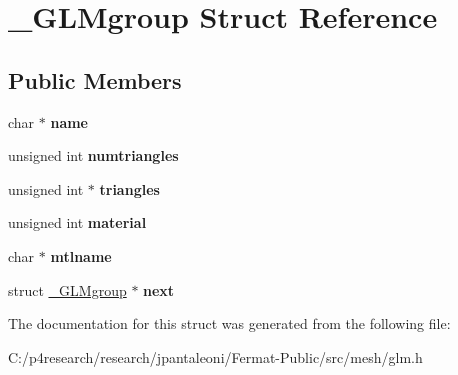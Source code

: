 \hypertarget{struct___g_l_mgroup}{}\section{\+\_\+\+G\+L\+Mgroup Struct Reference}
\label{struct___g_l_mgroup}
\subsection*{Public Members}
\begin{DoxyCompactItemize}
\item 
\mbox{\label{struct___g_l_mgroup_a17de10f71e980597335b72790acd6ec1}} 
char $\ast$ {\bfseries name}
\item 
\mbox{\label{struct___g_l_mgroup_aef01e77600bd78e9b86a00b35a78b93d}} 
unsigned int {\bfseries numtriangles}
\item 
\mbox{\label{struct___g_l_mgroup_ae6d76d287f9fd8b00206e90350cdf2d3}} 
unsigned int $\ast$ {\bfseries triangles}
\item 
\mbox{\label{struct___g_l_mgroup_af01897ad82f5b4416bbd2cab53f44e5d}} 
unsigned int {\bfseries material}
\item 
\mbox{\label{struct___g_l_mgroup_a1e3c2385b85fd0ac043f90249eea323b}} 
char $\ast$ {\bfseries mtlname}
\item 
\mbox{\label{struct___g_l_mgroup_a36bec6ef13eb38672c7bcd6d79681945}} 
struct \hyperlink{struct___g_l_mgroup}{\+\_\+\+G\+L\+Mgroup} $\ast$ {\bfseries next}
\end{DoxyCompactItemize}


The documentation for this struct was generated from the following file\+:\begin{DoxyCompactItemize}
\item 
C\+:/p4research/research/jpantaleoni/\+Fermat-\/\+Public/src/mesh/glm.\+h\end{DoxyCompactItemize}
